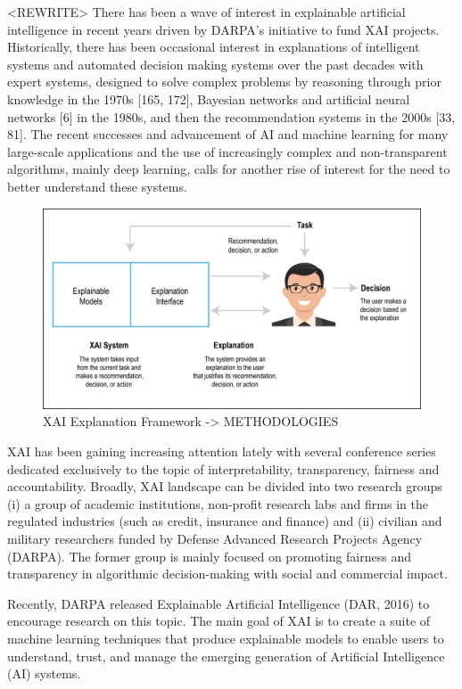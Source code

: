 <REWRITE> There has been a wave of interest in explainable artificial intelligence in recent years driven by DARPA’s initiative to fund XAI projects. Historically, there has been occasional interest in explanations of intelligent systems and automated decision making systems over the past decades with expert systems, designed to solve complex problems by reasoning through prior knowledge in the 1970s [165, 172], Bayesian networks and artificial neural networks [6] in the 1980s, and then the recommendation systems in the 2000s [33, 81]. The recent successes and advancement of AI and machine learning for many large-scale applications and the use of increasingly complex and non-transparent algorithms, mainly deep learning, calls for another rise of interest for the need to better understand these systems.

\begin{figure}[htbp]
\centering
\includegraphics[width=1\textwidth]{images/xai-1-01.png}
\caption{XAI Explanation Framework -> METHODOLOGIES}
\label{fig:xai-1}
\end{figure}

XAI has been gaining increasing attention lately with several conference series dedicated exclusively to the topic of interpretability, transparency, fairness and accountability. Broadly, XAI landscape can be divided into two research groups (i) a group of academic institutions, non-profit research labs and firms in the regulated industries (such as credit, insurance and finance) and (ii) civilian and military researchers funded by Defense Advanced Research Projects Agency (DARPA). The former group is mainly focused on promoting fairness and transparency in algorithmic decision-making with social and commercial impact.

Recently, DARPA released Explainable Artificial Intelligence (DAR, 2016) to encourage research on this topic. The main goal of XAI is to create a suite of machine learning techniques that produce explainable models to enable users to understand, trust, and manage the emerging generation of Artificial Intelligence (AI) systems.

